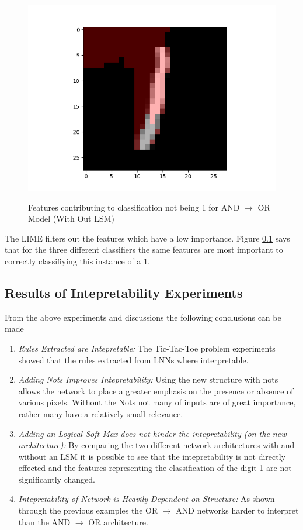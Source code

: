 \begin{figure}[H]
\begin{minipage}[b]{0.33\textwidth}
		\includegraphics[width=\textwidth]{LIME/MLPN.png}
		\label{}
	\end{minipage}
	\caption{Features contributing to classification not being 1 for AND $\rightarrow$ OR Model (With Out LSM)}
	\label{fig:and-or-lnn-with-lsm-like}
\end{figure}

The LIME filters out the features which have a low importance. Figure \ref{} says that for the three different classifiers the same features are most important to correctly classifiying this instance of a 1. 
\subsection{Results of Intepretability Experiments}
From the above experiments and discussions the following conclusions can be made

\begin{enumerate}
	\item \textit{Rules Extracted are Intepretable:} The Tic-Tac-Toe problem experiments showed that the rules extracted from LNNs where interpretable.
	\item \textit{Adding Nots Improves Intepretability:} Using the new structure with nots allows the network to place a greater emphasis on the presence or absence of various pixels. Without the Nots not many of inputs are of great importance, rather many have a relatively small relevance.
	\item \textit{Adding an Logical Soft Max does not hinder the intepretability (on the new architecture):} By comparing the two different network architectures with and without an LSM it is possible to see that the intepretability is not directly effected and the features representing the classification of the digit 1 are not significantly changed.
	\item \textit{Intepretability of Network is Heavily Dependent on Structure:} As shown through the previous examples the OR $\rightarrow$ AND networks harder to interpret than the AND $\rightarrow$ OR architecture.
\end{enumerate}


